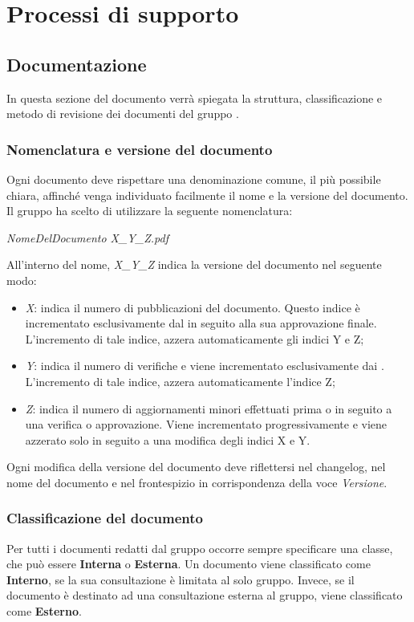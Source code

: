 \newpage

\section{Processi di supporto}

	\subsection{Documentazione}
	In questa sezione del documento verrà spiegata la struttura, classificazione e metodo di revisione dei documenti del gruppo \textit{\gruppo}.
	
		\subsubsection{Nomenclatura e versione del documento}
		Ogni documento deve rispettare una denominazione comune, il più possibile chiara, affinché venga individuato facilmente il nome e la versione del documento. Il gruppo ha scelto di utilizzare la seguente nomenclatura:
		\begin{center}
			\textit{NomeDelDocumento X\_Y\_Z.pdf}
		\end{center}
		All’interno del nome, \textit{X\_Y\_Z} indica la versione del documento nel seguente modo:
		\begin{itemize}
			\item \textit{X}: indica il numero di pubblicazioni del documento. Questo indice è incrementato esclusivamente dal \textit{\RdP} in seguito alla sua approvazione finale. L’incremento di tale indice, azzera automaticamente gli indici Y e Z;
			\item \textit{Y}: indica il numero di verifiche e viene incrementato esclusivamente dai \textit{\Vers}. L’incremento di tale indice, azzera automaticamente l'indice Z;
			\item \textit{Z}: indica il numero di aggiornamenti minori effettuati prima o in seguito a una verifica o approvazione. Viene incrementato progressivamente e viene azzerato solo in seguito a una modifica degli indici X e Y.
		\end{itemize}
		Ogni modifica della versione del documento deve riflettersi nel changelog, nel nome del documento e nel frontespizio in corrispondenza della voce \textit{Versione}.
	
		\subsubsection{Classificazione del documento}
		Per tutti i documenti redatti dal gruppo occorre sempre specificare una classe, che può essere \textbf{Interna} o \textbf{Esterna}.
		Un documento viene classificato come \textbf{Interno}, se la sua consultazione è limitata al solo gruppo. Invece, se il documento è destinato ad una consultazione esterna al gruppo, viene classificato come \textbf{Esterno}.
	
